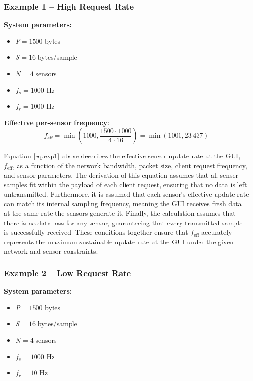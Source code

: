 \documentclass{article}
\begin{document}
\subsubsection{Example 1 – High Request Rate}

\textbf{System parameters:}
\begin{itemize}
    \item[] $P = 1500$ bytes
    \item[] $S = 16$ bytes/sample
    \item[] $N = 4$ sensors
    \item[] $f_s = 1000$ Hz
    \item[] $f_r = 1000$ Hz
\end{itemize}

\textbf{Effective per-sensor frequency:}
\begin{equation}
f_{\text{eff}} = \min \left( 1000, \frac{1500 \cdot 1000}{4 \cdot 16} \right) = \min(1000, 23\,437)
\label{eq:exp1}
\end{equation}


Equation \ref{eq:exp1} above describes the effective sensor update rate at the GUI, 
$f_\text{eff}$, as a function of the network bandwidth, packet size, client request 
frequency, and sensor parameters. The derivation of this equation assumes that all 
sensor samples fit within the payload of each client request, ensuring that no data is 
left untransmitted. Furthermore, it is assumed that each sensor's effective update 
rate can match its internal sampling frequency, meaning the GUI receives fresh data
at the same rate the sensors generate it. Finally, the calculation assumes that there 
is no data loss for any sensor, guaranteeing that every transmitted sample is 
successfully received. These conditions together ensure that 
$f_\text{eff}$ accurately represents the maximum sustainable update rate at the GUI under the 
given network and sensor constraints.

\subsubsection{Example 2 – Low Request Rate}

\textbf{System parameters:}
\begin{itemize}
    \item[] $P = 1500$ bytes
    \item[] $S = 16$ bytes/sample
    \item[] $N = 4$ sensors
    \item[] $f_s = 1000$ Hz
    \item[] $f_r = 10$ Hz
\end{itemize}
\end{document}
